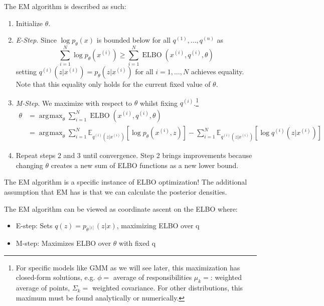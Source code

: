 \documentclass{article}
\DeclareMathOperator{\elbo}{ELBO}
\DeclareMathOperator*{\argmax}{\arg\!\max}
\begin{document}
  \begin{algo}[EM Algorithm]
    The EM algorithm is described as such: 
    \begin{enumerate}
      \item Initialize $\theta$.
      \item \textit{E-Step}. Since $\log p_\theta(x)$ is bounded below for all $q^{(1)}, \ldots, q^{(n)}$ as 
      \begin{equation}
        \sum_{i=1}^N \log p_\theta(x^{(i)}) \geq \sum_{i=1}^N \elbo(x^{(i)}, q^{(i)}, \theta)
      \end{equation}
      setting $q^{(i)}(z|x^{(i)}) = p_\theta(z|x^{(i)})$ for all $i = 1, \ldots, N$ achieves equality. Note that this equality only holds for the current fixed value of $\theta$.

      \item \textit{M-Step}. We maximize with respect to $\theta$ whilst fixing $q^{(i)}$.\footnote{For specific models like GMM as we will see later, this maximization has closed-form solutions, e.g. $\phi = $ average of responsibilities $\mu_k = $: weighted average of points, $\Sigma_k = $ weighted covariance. For other distributions, this maximum must be found analytically or numerically.}
      \begin{align}  
        \theta & = \argmax_\theta \sum_{i=1}^N \elbo(x^{(i)}, q^{(i)}, \theta) \\
        & = \argmax_\theta \sum_{i=1}^N \mathbb{E}_{q^{(i)}(z|x^{(i)})}[\log p_\theta(x^{(i)}, z)] - \sum_{i=1}^N \mathbb{E}_{q^{(i)}(z|x^{(i)})}[\log q^{(i)}(z|x^{(i)})]
      \end{align}

      \item Repeat steps 2 and 3 until convergence. Step 2 brings improvements because changing $\theta$ creates a new sum of ELBO functions as a new lower bound.
    \end{enumerate}
  \end{algo}

  The EM algorithm is a specific instance of ELBO optimization! The additional assumption that EM has is that we can calculate the posterior densities. 

  \begin{corollary}
    \label{thm:connection-to-elbo}
    The EM algorithm can be viewed as coordinate ascent on the ELBO where:
    \begin{itemize}
      \item E-step: Sets $q(z) = p_{\theta^{[t]}}(z|x)$, maximizing ELBO over q
      \item M-step: Maximizes ELBO over $\theta$ with fixed q
    \end{itemize}
  \end{corollary}
\end{document}
